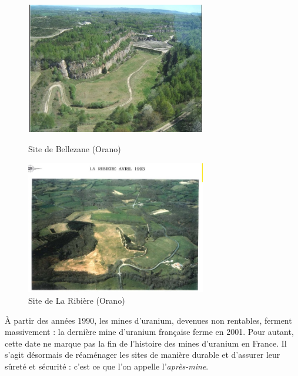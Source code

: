 \documentclass{article}
\begin{document}

\begin{figure}[H]
    \centering
    \begin{minipage}{0.5\textwidth}
        \centering
        \includegraphics[width=0.7\textwidth]{I_A_3.jpg} 
        \caption{Site de Bellezane (Orano)}
        \label{fig:bellezane1}
    \end{minipage}\hfill
    \begin{minipage}{0.5\textwidth}
        \centering
        \includegraphics[width=0.7\textwidth]{I_A_4.jpg} 
        \caption{Site de La Ribière (Orano)}
        \label{fig:ribiere1}
    \end{minipage}
\end{figure}


À partir des années 1990, les mines d’uranium, devenues non rentables, ferment massivement : la dernière mine d’uranium française ferme en 2001. Pour autant, cette date ne marque pas la fin de l’histoire des mines d’uranium en France. Il s’agit désormais de réaménager les sites de manière durable et d'assurer leur sûreté et sécurité : c’est ce que l’on appelle l’\emph{après-mine}.
\end{document}
